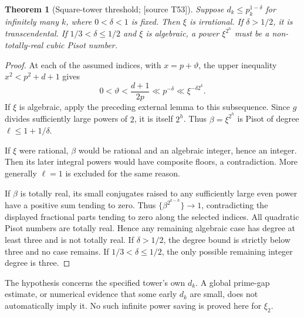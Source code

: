 \documentclass[11pt,a4paper]{article}
\newtheorem{theorem}{Theorem}[section]
\theoremstyle{definition}\newtheorem{definition}[theorem]{Definition}
\theoremstyle{remark}\newtheorem{remark}[theorem]{Remark}
\newcommand{\sourceT}[1]{\textup{[source T#1]}}
\begin{document}
\begin{theorem}[Square-tower threshold; \sourceT{53}]\label{thm:squarethreshold}
Suppose $d_k\le p_k^{1-\delta}$ for infinitely many $k$, where $0<\delta<1$ is fixed. Then $\xi$ is irrational. If $\delta>1/2$, it is transcendental. If $1/3<\delta\le1/2$ and $\xi$ is algebraic, a power $\xi^{2^h}$ must be a non-totally-real cubic Pisot number.
\end{theorem}
\begin{proof}
At each of the assumed indices, with $x=p+\vartheta$, the upper inequality $x^2<p^2+d+1$ gives
\[
 0<\vartheta<\frac{d+1}{2p}\ll p^{-\delta}\ll\xi^{-\delta2^k}.
\]
If $\xi$ is algebraic, apply the preceding external lemma to this subsequence. Since $g$ divides sufficiently large powers of $2$, it is itself $2^h$. Thus $\beta=\xi^{2^h}$ is Pisot of degree $\ell\le1+1/\delta$.

If $\xi$ were rational, $\beta$ would be rational and an algebraic integer, hence an integer. Then its later integral powers would have composite floors, a contradiction. More generally $\ell=1$ is excluded for the same reason.

If $\beta$ is totally real, its small conjugates raised to any sufficiently large even power have a positive sum tending to zero. Thus $\{\beta^{2^{k-h}}\}\to1$, contradicting the displayed fractional parts tending to zero along the selected indices. All quadratic Pisot numbers are totally real. Hence any remaining algebraic case has degree at least three and is not totally real. If $\delta>1/2$, the degree bound is strictly below three and no case remains. If $1/3<\delta\le1/2$, the only possible remaining integer degree is three.
\end{proof}
The hypothesis concerns the specified tower's own $d_k$. A global prime-gap estimate, or numerical evidence that some early $d_k$ are small, does not automatically imply it. No such infinite power saving is proved here for $\xi_2$.
\end{document}
